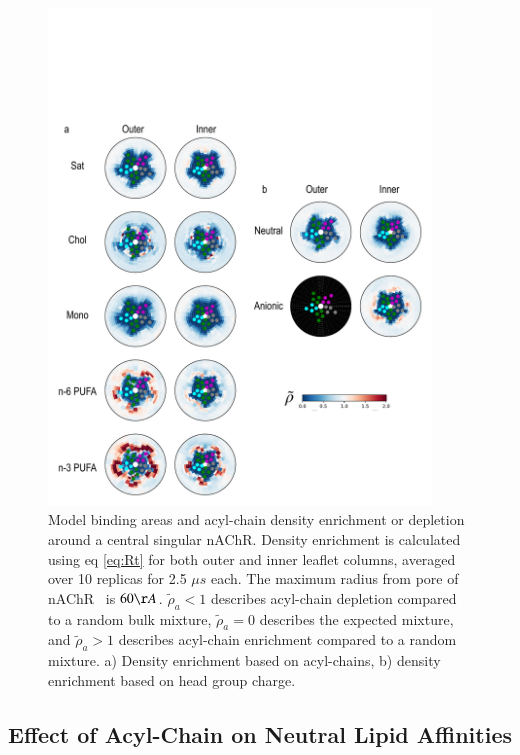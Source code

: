 \documentclass[preprint,3p,9pt,times,onecolumn]{elsarticle}
\newcommand{\nachr}{nAChR}
\begin{document}
\begin{figure}[!h]
	\center
	\includegraphics[width=4in]{acyl_heatmap.pdf}
	\caption{Model binding areas and acyl-chain density enrichment or depletion around a central singular \nachr.  Density enrichment is calculated using eq \ref{eq:Rt} for both outer and inner leaflet columns, averaged over 10 replicas for 2.5 $\mu s$ each. The maximum radius from pore of \nachr~ is $60 \AA$. $\tilde{\rho}_{a}< 1$ describes acyl-chain depletion compared to a random bulk mixture, $\tilde{\rho}_{a}=0$ describes the expected mixture, and $\tilde{\rho}_{a}  > 1$ describes acyl-chain enrichment compared to a random mixture. a) Density enrichment based on acyl-chains, b) density enrichment based on head group charge.}
	\label{fig:acyl_map}
\end{figure}

\subsection{Effect of Acyl-Chain on Neutral Lipid Affinities}

\end{document}
